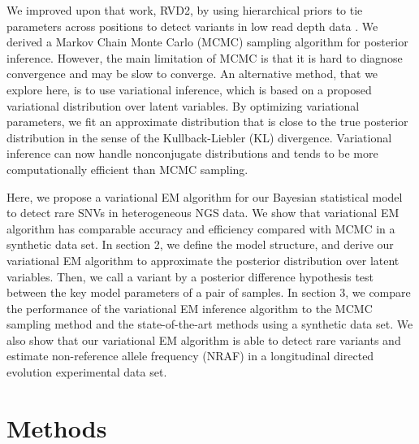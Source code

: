 \documentclass{bmcart}
\begin{document}
We improved upon that work, RVD2, by using hierarchical priors to tie parameters across positions to detect variants in low read depth data \cite{he2015rvd2}.
We derived a Markov Chain Monte Carlo (MCMC) sampling algorithm for posterior inference.
However, the main limitation of MCMC is that it is hard to diagnose convergence and may be slow to converge\cite{jordan1999introduction}.
An alternative method, that we explore here, is to use variational inference, which is based on a proposed variational distribution over latent variables.
By optimizing variational parameters, we fit an approximate distribution that is close to the true posterior distribution in the sense of the Kullback-Liebler (KL) divergence.
Variational inference can now handle nonconjugate distributions and tends to be more computationally efficient than MCMC sampling\cite{peterson1989explorations}.

Here, we propose a variational EM algorithm for our Bayesian statistical model to detect rare SNVs in heterogeneous NGS data.
We show that variational EM algorithm has comparable accuracy and efficiency compared with MCMC in a synthetic data set.
In section 2, we define the model structure, and derive our variational EM algorithm to approximate the posterior distribution over latent variables.
Then, we call a variant by a posterior difference hypothesis test between the key model parameters of a pair of samples.
In section 3, we compare the performance of the variational EM inference algorithm to the MCMC sampling method and the state-of-the-art methods using a synthetic data set.
We also show that our variational EM algorithm is able to detect rare variants and estimate non-reference allele frequency (NRAF) in a longitudinal directed evolution experimental data set.

\section{Methods}
\end{document}
